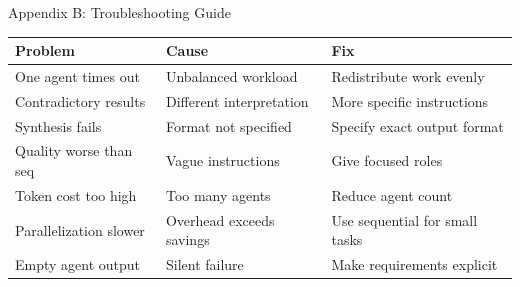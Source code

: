 \documentclass[aspectratio=169,11pt]{beamer}
\begin{document}
\begin{frame}{Appendix B: Troubleshooting Guide}
    \footnotesize
    \begin{tabular}{p{3.5cm}p{4cm}p{4cm}}
        \toprule
        \textbf{Problem} & \textbf{Cause} & \textbf{Fix} \\
        \midrule
        One agent times out & Unbalanced workload & Redistribute work evenly \\
        Contradictory results & Different interpretation & More specific instructions \\
        Synthesis fails & Format not specified & Specify exact output format \\
        Quality worse than seq & Vague instructions & Give focused roles \\
        Token cost too high & Too many agents & Reduce agent count \\
        Parallelization slower & Overhead exceeds savings & Use sequential for small tasks \\
        Empty agent output & Silent failure & Make requirements explicit \\
        \bottomrule
    \end{tabular}
\end{frame}
\end{document}
